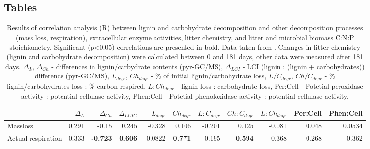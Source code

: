 \documentclass[10pt]{article}
\begin{document}
\begin{flushleft}
\newpage
\section*{Tables}








%


\begin{landscape}

\begin{table}[h!]
\begin{center}
\caption{Results of correlation analysis (R) between lignin and carbohydrate decomposition and other decomposition processes (mass loss, respiration), extracellular enzyme activities, litter chemistry, and litter and microbial biomass C:N:P stoichiometry. Significant (p\textless 0.05) correlations are presented in bold. Data taken from \cite{Mooshammer2011, Leitner2011}. Changes in litter chemistry (lignin and carbohydrate decomposition) were calculated between 0 and 181 days, other data were measured after 181 days. $\Delta _{L}$, $\Delta _{Ch}$ - differences in lignin/carbydrate contents (pyr-GC/MS), $\Delta _{LCI}$ - LCI (lignin : (lignin + carbohydrates)) difference (pyr-GC/MS), $L_{degr}$, $Ch_{degr}$ - \% of initial lignin/carbohydrate loss, $L/C_{degr}$, $Ch/C_{degr}$  - \% lignin/carbohydrates loss : \% carbon respired, $L:Ch_{degr}$ - lignin loss : carbohydrate loss, Per:Cell - Potetial peroxidase activity : potential cellulase activity, Phen:Cell - Potetial phenoloxidase activity : potential cellulase activity.}
\label{corrtable}
{\small
\begin{tabular}{lrrrrrrrrrr}
  \hline
 & $\Delta _{L}$ & $\Delta _{Ch}$ & $\Delta _{LCIC}$ & $L_{degr}$ & $Ch_{degr}$ & $L:C_{degr}$ & $Ch:C_{degr}$ & $L:Ch_{degr}$ & Per:Cell & Phen:Cell \\ 
  \hline
Massloss & 0.291 & -0.15 & 0.245 & -0.328 & 0.106 & -0.201 & 0.125 & -0.081 & 0.048 & 0.0534 \\ 
  Actual respiration & 0.333 & \textbf{ -0.723 } & \textbf{ 0.606 } & -0.0822 & \textbf{ 0.771 } & -0.195 & \textbf{ 0.594 } & -0.368 & -0.268 & -0.362 \\ 

\end{tabular}}
\end{center}
\end{table}
\end{landscape}
\end{flushleft}
\end{document}
